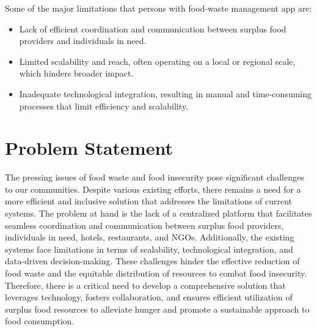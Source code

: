 Some of the major limitations that persons with food-waste management app are:
\begin{itemize}
	\item Lack of efficient coordination and communication between surplus food providers and individuals in need.
	\item Limited scalability and reach, often operating on a local or regional scale, which hinders broader impact.
	\item Inadequate technological integration, resulting in manual and time-consuming processes that limit efficiency and scalability. 
\end{itemize}
\section{ Problem Statement}
The pressing issues of food waste and food insecurity pose significant challenges to our communities. Despite various existing efforts, there remains a need for a more efficient and inclusive solution that addresses the limitations of current systems. The problem at hand is the lack of a centralized platform that facilitates seamless coordination and communication between surplus food providers, individuals in need, hotels, restaurants, and NGOs. Additionally, the existing systems face limitations in terms of scalability, technological integration, and data-driven decision-making. These challenges hinder the effective reduction of food waste and the equitable distribution of resources to combat food insecurity. Therefore, there is a critical need to develop a comprehensive solution that leverages technology, fosters collaboration, and ensures efficient utilization of surplus food resources to alleviate hunger and promote a sustainable approach to food consumption.